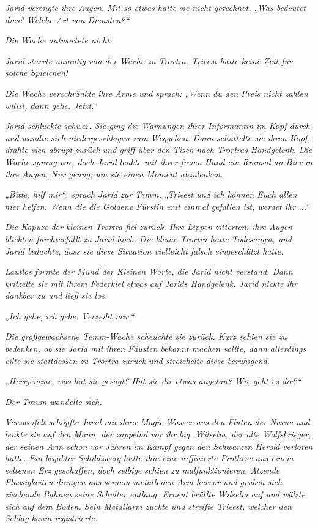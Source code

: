 \textit{Jarid verengte ihre Augen. Mit so etwas hatte sie nicht gerechnet. „Was bedeutet dies? Welche Art von Diensten?“}

\textit{Die Wache antwortete nicht.}

\textit{Jarid starrte unmutig von der Wache zu Trortra. Trieest hatte keine Zeit für solche Spielchen!}

\textit{Die Wache verschränkte ihre Arme und sprach: „Wenn du den Preis nicht zahlen willst, dann gehe. Jetzt.“}

\textit{Jarid schluckte schwer. Sie ging die Warnungen ihrer Informantin im Kopf durch und wandte sich niedergeschlagen zum Weggehen. Dann schüttelte sie ihren Kopf, drahte sich abrupt zurück und griff über den Tisch nach Trortras Handgelenk. Die Wache sprang vor, doch Jarid lenkte mit ihrer freien Hand ein Rinnsal an Bier in ihre Augen. Nur genug, um sie einen Moment abzulenken.}

\textit{„Bitte, hilf mir“, sprach Jarid zur Temm, „Trieest und ich können Euch allen hier helfen. Wenn die die Goldene Fürstin erst einmal gefallen ist, werdet ihr ...“}

\textit{Die Kapuze der kleinen Trortra fiel zurück. Ihre Lippen zitterten, ihre Augen blickten furchterfüllt zu Jarid hoch. Die kleine Trortra hatte Todesangst, und Jarid bedachte, dass sie diese Situation vielleicht falsch eingeschätzt hatte.}

\textit{Lautlos formte der Mund der Kleinen Worte, die Jarid nicht verstand. Dann kritzelte sie mit ihrem Federkiel etwas auf Jarids Handgelenk. Jarid nickte ihr dankbar zu und ließ sie los.}

\textit{„Ich gehe, ich gehe. Verzeiht mir.“}

\textit{Die großgewachsene Temm-Wache scheuchte sie zurück. Kurz schien sie zu bedenken, ob sie Jarid mit ihren Fäusten bekannt machen sollte, dann allerdings eilte sie stattdessen zu Trortra zurück und streichelte diese beruhigend.}

\textit{„Herrjemine, was hat sie gesagt? Hat sie dir etwas angetan? Wie geht es dir?“}\bigskip



\textit{Der Traum wandelte sich.}\bigskip






\textit{Verzweifelt schöpfte Jarid mit ihrer Magie Wasser aus den Fluten der Narne und lenkte sie auf den Mann, der zappelnd vor ihr lag. Wilselm, der alte Wolfskrieger, der seinen Arm schon vor Jahren im Kampf gegen den Schwarzen Herold verloren hatte. Ein begabter Schildzwerg hatte ihm eine raffinierte Prothese aus einem seltenen Erz geschaffen, doch selbige schien zu malfunktionieren. Ätzende Flüssigkeiten drangen aus seinem metallenen Arm hervor und gruben sich zischende Bahnen seine Schulter entlang. Erneut brüllte Wilselm auf und wälzte sich auf dem Boden. Sein Metallarm zuckte und streifte Trieest, welcher den Schlag kaum registrierte.}

